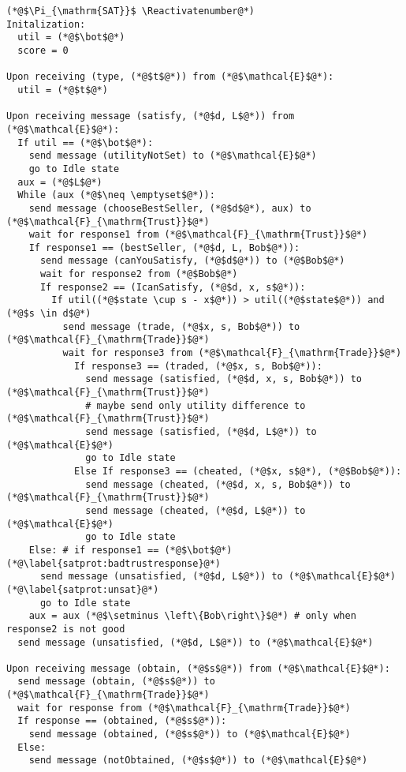 \Suppressnumber
\begin{lstlisting}[label=satprot, style=numbers]
(*@$\Pi_{\mathrm{SAT}}$ \Reactivatenumber@*)
Initalization:
  util = (*@$\bot$@*)
  score = 0

Upon receiving (type, (*@$t$@*)) from (*@$\mathcal{E}$@*):
  util = (*@$t$@*)

Upon receiving message (satisfy, (*@$d, L$@*)) from (*@$\mathcal{E}$@*):
  If util == (*@$\bot$@*):
    send message (utilityNotSet) to (*@$\mathcal{E}$@*)
    go to Idle state
  aux = (*@$L$@*)
  While (aux (*@$\neq \emptyset$@*)):
    send message (chooseBestSeller, (*@$d$@*), aux) to (*@$\mathcal{F}_{\mathrm{Trust}}$@*)
    wait for response1 from (*@$\mathcal{F}_{\mathrm{Trust}}$@*)
    If response1 == (bestSeller, (*@$d, L, Bob$@*)):
      send message (canYouSatisfy, (*@$d$@*)) to (*@$Bob$@*)
      wait for response2 from (*@$Bob$@*)
      If response2 == (IcanSatisfy, (*@$d, x, s$@*)):
        If util((*@$state \cup s - x$@*)) > util((*@$state$@*)) and (*@$s \in d$@*)
          send message (trade, (*@$x, s, Bob$@*)) to (*@$\mathcal{F}_{\mathrm{Trade}}$@*)
          wait for response3 from (*@$\mathcal{F}_{\mathrm{Trade}}$@*)
            If response3 == (traded, (*@$x, s, Bob$@*)):
              send message (satisfied, (*@$d, x, s, Bob$@*)) to (*@$\mathcal{F}_{\mathrm{Trust}}$@*)
              # maybe send only utility difference to (*@$\mathcal{F}_{\mathrm{Trust}}$@*)
              send message (satisfied, (*@$d, L$@*)) to (*@$\mathcal{E}$@*)
              go to Idle state
            Else If response3 == (cheated, (*@$x, s$@*), (*@$Bob$@*)):
              send message (cheated, (*@$d, x, s, Bob$@*)) to (*@$\mathcal{F}_{\mathrm{Trust}}$@*)
              send message (cheated, (*@$d, L$@*)) to (*@$\mathcal{E}$@*)
              go to Idle state
    Else: # if response1 == (*@$\bot$@*) (*@\label{satprot:badtrustresponse}@*)
      send message (unsatisfied, (*@$d, L$@*)) to (*@$\mathcal{E}$@*) (*@\label{satprot:unsat}@*)
      go to Idle state
    aux = aux (*@$\setminus \left\{Bob\right\}$@*) # only when response2 is not good
  send message (unsatisfied, (*@$d, L$@*)) to (*@$\mathcal{E}$@*)

Upon receiving message (obtain, (*@$s$@*)) from (*@$\mathcal{E}$@*):
  send message (obtain, (*@$s$@*)) to (*@$\mathcal{F}_{\mathrm{Trade}}$@*)
  wait for response from (*@$\mathcal{F}_{\mathrm{Trade}}$@*)
  If response == (obtained, (*@$s$@*)):
    send message (obtained, (*@$s$@*)) to (*@$\mathcal{E}$@*)
  Else:
    send message (notObtained, (*@$s$@*)) to (*@$\mathcal{E}$@*)


\end{lstlisting}
